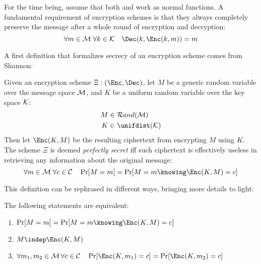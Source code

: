For the time being, assume that both \Enc{} and \Dec{} work as normal functions. A fundamental requirement of encryption schemes is that they always completely preserve the message after a whole round of encryption and decryption:
\[
    \forall m \in \M \; \forall k \in \K \quad \Dec(k, \Enc(k, m)) = m
\]

A first definition that formalizes secrecy of an encryption scheme comes from Shannon:

\begin{definition}
    Given an encryption scheme $\Xi: (\Enc, \Dec)$, let $M$ be a generic random variable over the message space $\mathcal{M}$, and $K$ be a uniform random variable over the key space $\mathcal{K}$:
    \begin{align*}
        M \in&\ \mathcal{R}and(\M) \\
        K \in&\ \unifdist(\K)
    \end{align*}
    Then let $\Enc(K, M)$ be the resulting ciphertext from encrypting $M$ using $K$. The scheme $\Xi$ is deemed \emph{perfectly secret} iff such ciphertext is effectively useless in retrieving any information about the original message:
    \[
        \forall m \in \M \; \forall c \in \C \quad \Pr[M = m] = \Pr[M = m \knowing \Enc(K, M) = c]
    \]
\end{definition}

This definition can be rephrased in different ways, bringing more details to light:
    
\begin{proposition}
    The following statements are equivalent:
    \begin{enumerate}
        \item \label{def:ps1} $\Pr[M = m] = \Pr[M = m \knowing \Enc(K, M) = c]$
        \item \label{def:ps2} $M \indep \Enc(K, M)$
        \item \label{def:ps3} $\forall m_1, m_2 \in \M \, \forall c \in \C \quad \Pr[\Enc(K, m_1) = c] = \Pr[\Enc(K, m_2) = c]$
    \end{enumerate}
\end{proposition}

